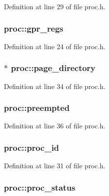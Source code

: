 \-Definition at line 29 of file proc.\-h.

\hypertarget{structproc_a477ac830839c6d6d6e7307e5b2e417d5}{
\subsubsection[{gpr\-\_\-regs}]{ {\bf proc\-::gpr\-\_\-regs}}}\label{structproc_a477ac830839c6d6d6e7307e5b2e417d5}


\-Definition at line 24 of file proc.\-h.

\hypertarget{structproc_a28407ef578b1a5f1a5947400130516d5}{
\subsubsection[{page\-\_\-directory}]{$\ast$ {\bf proc\-::page\-\_\-directory}}}\label{structproc_a28407ef578b1a5f1a5947400130516d5}


\-Definition at line 34 of file proc.\-h.

\hypertarget{structproc_ac5ce1257f9f754b8d50b4aade713999d}{
\subsubsection[{preempted}]{ {\bf proc\-::preempted}}}\label{structproc_ac5ce1257f9f754b8d50b4aade713999d}


\-Definition at line 36 of file proc.\-h.

\hypertarget{structproc_a84a7b5847b08fe2a3f394d3cdacde847}{
\subsubsection[{proc\-\_\-id}]{ {\bf proc\-::proc\-\_\-id}}}\label{structproc_a84a7b5847b08fe2a3f394d3cdacde847}


\-Definition at line 31 of file proc.\-h.

\hypertarget{structproc_aac562ad34873ba0fe5766d6ab713ed03}{
\subsubsection[{proc\-\_\-status}]{ {\bf proc\-::proc\-\_\-status}}}\label{structproc_aac562ad34873ba0fe5766d6ab713ed03}


